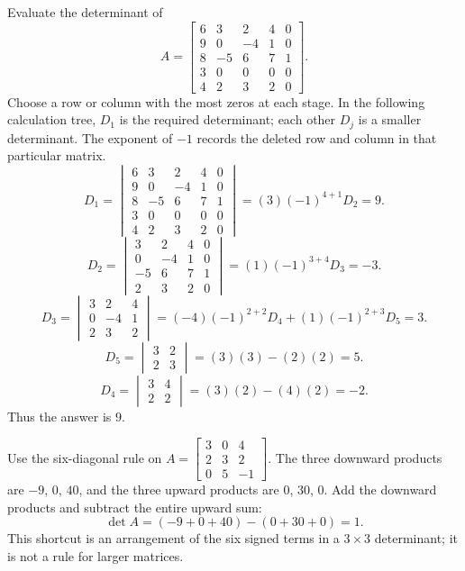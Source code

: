 \goal Evaluate the determinant of
\[A=\begin{bmatrix}6&3&2&4&0\\9&0&-4&1&0\\8&-5&6&7&1\\3&0&0&0&0\\4&2&3&2&0\end{bmatrix}.\]
Choose a row or column with the most zeros at each stage. In the following calculation tree, $D_{1}$ is the required determinant; each other $D_j$ is a smaller determinant. The exponent of $-1$ records the deleted row and column in that particular matrix.
\[
D_{1}=\begin{vmatrix}6&3&2&4&0\\9&0&-4&1&0\\8&-5&6&7&1\\3&0&0&0&0\\4&2&3&2&0\end{vmatrix}=(3)(-1)^{4+1}D_{2}=9.
\]
\[
D_{2}=\begin{vmatrix}3&2&4&0\\0&-4&1&0\\-5&6&7&1\\2&3&2&0\end{vmatrix}=(1)(-1)^{3+4}D_{3}=-3.
\]
\[
D_{3}=\begin{vmatrix}3&2&4\\0&-4&1\\2&3&2\end{vmatrix}=(-4)(-1)^{2+2}D_{4} + (1)(-1)^{2+3}D_{5}=3.
\]
\[
D_{5}=\begin{vmatrix}3&2\\2&3\end{vmatrix}=(3)(3)-(2)(2)=5.
\]
\[
D_{4}=\begin{vmatrix}3&4\\2&2\end{vmatrix}=(3)(2)-(4)(2)=-2.
\]
Thus the answer is $9$.

\goal Use the six-diagonal rule on $A=\begin{bmatrix}3&0&4\\2&3&2\\0&5&-1\end{bmatrix}$.
The three downward products are $-9$, $0$, $40$, and the three upward products are $0$, $30$, $0$. Add the downward products and subtract the entire upward sum:
\[\det A=(-9+0+40)-(0+30+0)=1.\]
This shortcut is an arrangement of the six signed terms in a $3\times3$ determinant; it is not a rule for larger matrices.

